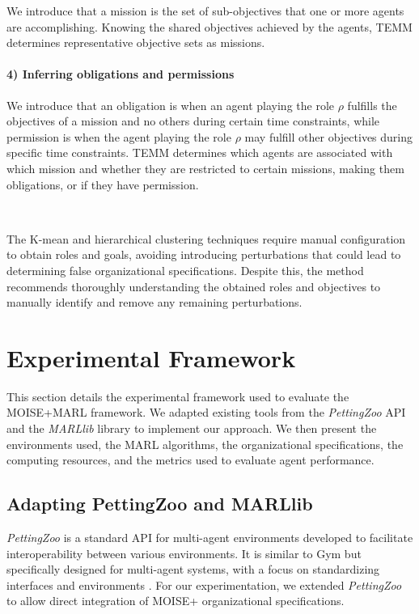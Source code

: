 \documentclass[sigconf,anonymous]{aamas}
\begin{document}
We introduce that a mission is the set of sub-objectives that one or more agents are accomplishing.
Knowing the shared objectives achieved by the agents, TEMM determines representative objective sets as missions.

\paragraph{\textbf{4) Inferring obligations and permissions}}

We introduce that an obligation is when an agent playing the role $\rho$ fulfills the objectives of a mission and no others during certain time constraints, while permission is when the agent playing the role $\rho$ may fulfill other objectives during specific time constraints.
TEMM determines which agents are associated with which mission and whether they are restricted to certain missions, making them obligations, or if they have permission.

\

The K-mean and hierarchical clustering techniques require manual configuration to obtain roles and goals, avoiding introducing perturbations that could lead to determining false organizational specifications. Despite this, the method recommends thoroughly understanding the obtained roles and objectives to manually identify and remove any remaining perturbations.

\section{Experimental Framework}
\label{sec:experimental_setup}

This section details the experimental framework used to evaluate the MOISE+MARL framework. We adapted existing tools from the \textit{PettingZoo} API and the \textit{MARLlib} library to implement our approach. We then present the environments used, the MARL algorithms, the organizational specifications, the computing resources, and the metrics used to evaluate agent performance.

\subsection{Adapting PettingZoo and MARLlib}

\textit{PettingZoo} is a standard API for multi-agent environments developed to facilitate interoperability between various environments. It is similar to Gym but specifically designed for multi-agent systems, with a focus on standardizing interfaces and environments \cite{terry2020pettingzoo}. For our experimentation, we extended \textit{PettingZoo} to allow direct integration of MOISE+ organizational specifications.
\end{document}
